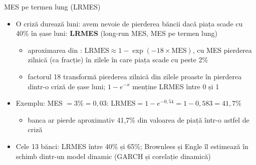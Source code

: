 \begin{frame}{MES pe termen lung (LRMES)}
\itemsize{\small}
\begin{itemize}
    \item O criză durează luni: avem nevoie de pierderea băncii dacă piața scade cu 40\% în șase luni: \textbf{LRMES} (long-run MES, MES pe termen lung)
    \begin{itemize}
        \item aproximarea din : $\mathrm{LRMES} \approx 1 - \exp(-18 \times \mathrm{MES})$, cu MES pierderea zilnică (ca fracție) în zilele în care piața scade cu peste 2\%
        \item factorul 18 transformă pierderea zilnică din zilele proaste în pierderea dintr-o criză de șase luni; $1 - e^{-x}$ menține LRMES între 0 și 1
    \end{itemize}
    \item Exemplu: MES $= 3\% = 0{,}03$: $\mathrm{LRMES} = 1 - e^{-0{,}54} = 1 - 0{,}583 = 41{,}7\%$
    \begin{itemize}
        \item banca ar pierde aproximativ 41{,}7\% din valoarea de piață într-o astfel de criză
    \end{itemize}
    \item Cele 13 bănci: LRMES între 40\% și 65\%; Brownlees și Engle îl estimează în schimb dintr-un model dinamic (GARCH și corelație dinamică) 
\end{itemize}
\end{frame}

